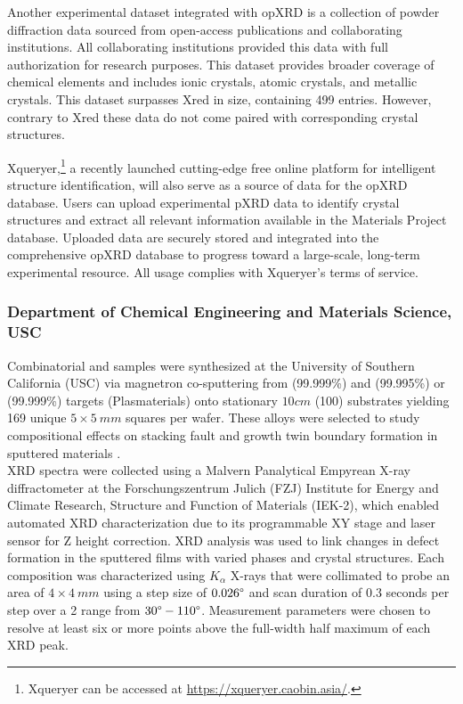 Another experimental dataset integrated with opXRD is a collection of powder diffraction data sourced from open-access publications and collaborating institutions. All collaborating institutions provided this data with full authorization for research purposes. This dataset provides broader coverage of chemical elements and includes ionic crystals, atomic crystals, and metallic crystals. This dataset surpasses Xred in size, containing 499 entries. However, contrary to Xred these data do not come paired with corresponding crystal structures.


Xqueryer,\footnote{Xqueryer can be accessed at \url{https://xqueryer.caobin.asia/}.} a recently launched cutting-edge free online platform for intelligent structure identification, will also serve as a source of data for the opXRD database. Users can upload experimental pXRD data to identify crystal structures and extract all relevant information available in the Materials Project database\cite{jain2013commentary}. Uploaded data are securely stored and integrated into the comprehensive opXRD database to progress toward a large-scale, long-term experimental resource. All usage complies with Xqueryer's terms of service.


\subsubsection*{Department of Chemical Engineering and Materials Science, USC}

Combinatorial  and  samples were synthesized at the University of Southern California (USC) via magnetron co-sputtering from  (99.999\%) and  (99.995\%) or  (99.999\%) targets (Plasmaterials) onto stationary $10 \si{cm}$  (100) substrates yielding 169 unique $5 \times 5 \ \si{mm}$ squares per wafer. These alloys were selected to study compositional effects on stacking fault and growth twin boundary formation in sputtered materials \cite{alwen2024_1,alwen2024_2}. \\

XRD spectra were collected using a Malvern Panalytical Empyrean X-ray diffractometer at the Forschungszentrum Julich (FZJ) Institute for Energy and Climate Research, Structure and Function of Materials (IEK-2), which enabled automated XRD characterization due to its programmable XY stage and laser sensor for Z height correction. XRD analysis was used to link changes in defect formation in the sputtered films with varied phases and crystal structures. Each composition was characterized using  $K_\alpha$ X-rays that were collimated to probe an area of $4 \times 4 \ \si{mm}$ using a step size of $0.026\degree$ and scan duration of $0.3$ seconds per step over a 2 range from $30\degree - 110\degree$. Measurement parameters were chosen to resolve at least six or more points above the full-width half maximum of each XRD peak.

